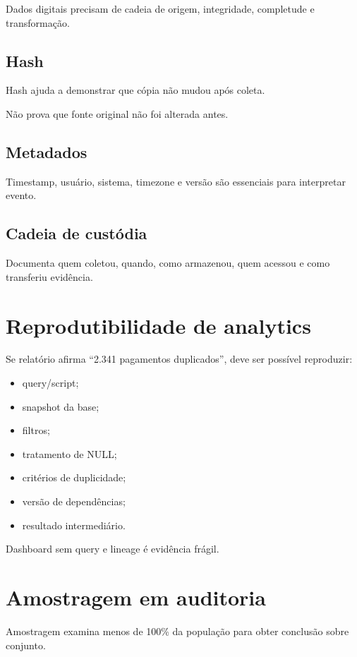 Dados digitais precisam de cadeia de origem, integridade, completude e transformação.

\subsection{Hash}

Hash ajuda a demonstrar que cópia não mudou após coleta.

Não prova que fonte original não foi alterada antes.

\subsection{Metadados}

Timestamp, usuário, sistema, timezone e versão são essenciais para interpretar evento.

\subsection{Cadeia de custódia}

Documenta quem coletou, quando, como armazenou, quem acessou e como transferiu evidência.

\section{Reprodutibilidade de analytics}

Se relatório afirma ``2.341 pagamentos duplicados'', deve ser possível reproduzir:
\begin{itemize}
\item query/script;
\item snapshot da base;
\item filtros;
\item tratamento de NULL;
\item critérios de duplicidade;
\item versão de dependências;
\item resultado intermediário.
\end{itemize}

Dashboard sem query e lineage é evidência frágil.

\section{Amostragem em auditoria}

Amostragem examina menos de 100\% da população para obter conclusão sobre conjunto.

